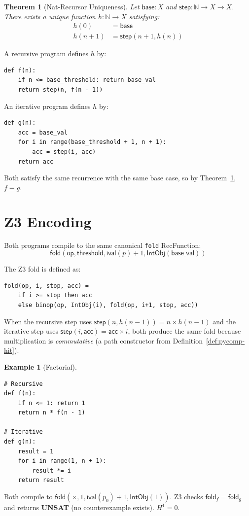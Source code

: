 \documentclass[11pt,a4paper]{report}
\theoremstyle{definition}
\newtheorem{example}[definition]{Example}
\theoremstyle{plain}
\newtheorem{theorem}[definition]{Theorem}
\newcommand{\Nat}{\mathbb{N}}
\newcommand{\fold}{\mathsf{fold}}
\newcommand{\op}{\mathsf{op}}
\newcommand{\Hone}{H^1}
\begin{document}
\begin{theorem}[Nat-Recursor Uniqueness]
\label{thm:nat-rec}
Let $\mathsf{base} : X$ and $\mathsf{step} : \Nat \to X \to X$.
There exists a \emph{unique} function $h : \Nat \to X$ satisfying:
\begin{align}
  h(0) &= \mathsf{base} \\
  h(n+1) &= \mathsf{step}(n+1, h(n))
\end{align}
\end{theorem}

A recursive program defines $h$ by:
\begin{lstlisting}
def f(n):
    if n <= base_threshold: return base_val
    return step(n, f(n - 1))
\end{lstlisting}

An iterative program defines $h$ by:
\begin{lstlisting}
def g(n):
    acc = base_val
    for i in range(base_threshold + 1, n + 1):
        acc = step(i, acc)
    return acc
\end{lstlisting}

Both satisfy the same recurrence with the same base case, so by
Theorem~\ref{thm:nat-rec}, $f \equiv g$.

\section{Z3 Encoding}

Both programs compile to the same canonical \texttt{fold} RecFunction:
\[
  \fold(\op, \mathsf{threshold}, \mathsf{ival}(p) + 1,
  \mathsf{IntObj}(\mathsf{base\_val}))
\]

The Z3 fold is defined as:
\begin{lstlisting}
fold(op, i, stop, acc) =
    if i >= stop then acc
    else binop(op, IntObj(i), fold(op, i+1, stop, acc))
\end{lstlisting}

When the recursive step uses $\mathsf{step}(n, h(n-1)) = n \times h(n-1)$
and the iterative step uses $\mathsf{step}(i, \mathsf{acc}) =
\mathsf{acc} \times i$, both produce the same fold because
multiplication is \emph{commutative} (a path constructor from
Definition~\ref{def:pycomp-hit}).

\begin{example}[Factorial]
\label{ex:factorial}
\begin{lstlisting}
# Recursive
def f(n):
    if n <= 1: return 1
    return n * f(n - 1)

# Iterative
def g(n):
    result = 1
    for i in range(1, n + 1):
        result *= i
    return result
\end{lstlisting}

Both compile to $\fold(\times, 1, \mathsf{ival}(p_0)+1,
\mathsf{IntObj}(1))$.  Z3 checks $\fold_f = \fold_g$ and returns
\textbf{UNSAT} (no counterexample exists).  $\Hone = 0$.
\end{example}
\end{document}
